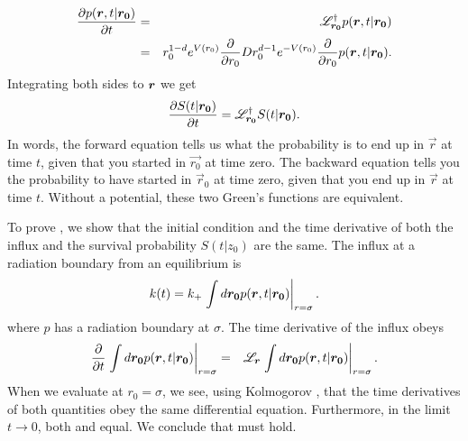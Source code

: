 \begin{eqnarray}
 \elabel{backward_eqn}
 \pdiff{p(\vect{r},t|\vect{r_0})}{t} & = & \mathscr{L}_{\vect{r_0}}^{\dag} p(\vect{r},t|\vect{r_0}) \\
 & = & r_0^{1-d} e^{V(r_0)} \pdiff{}{r_0} D r_0^{d-1} e^{-V(r_0)} \pdiff{}{r_0} p(\vect{r},t|\vect{r_0}). 
\end{eqnarray}
Integrating both sides to $\boldsymbol{r}$ we get
\begin{equation}
 \pdiff{S(t|\vect{r_0})}{t} = \mathscr{L}_{\vect{r_0}}^{\dag} S(t|\vect{r_0}).
 \elabel{S_eqn}
\end{equation}
In words, the forward equation tells us what the probability is to end up in $\vec{r}$ at time $t$, given that you started in $\vec{r_0}$ at time zero. The backward equation tells you the probability to have started in $\vec{r}_0$ at time zero, given that you end up in $\vec{r}$ at time $t$. Without a potential, these two Green's functions are equivalent.

To prove , we show that the initial condition and the time derivative of both the influx and the survival probability $S(t|z_0)$ are the same. The influx at a radiation boundary from an equilibrium is
\begin{equation}
 k(t) = k_+ \left. \int d\vect{r_0} p(\vect{r},t|\vect{r_0}) \right|_{r=\sigma}.
 \elabel{bsm_3}
\end{equation}
where $p$ has a radiation boundary at $\sigma$. The time derivative of the influx obeys
\begin{eqnarray}
 \frac{\partial }{\partial t} \left. \int d\boldsymbol{r_0} p(\boldsymbol{r},t|\boldsymbol{r_0}) \right|_{r=\sigma} & = & \mathscr{L}_{\boldsymbol{r}} \left. \int d\boldsymbol{r_0} p(\boldsymbol{r},t|\boldsymbol{r_0}) \right|_{r=\sigma}.
\end{eqnarray}
When we evaluate  at $r_0=\sigma$, we see, using Kolmogorov , that the time derivatives of both quantities obey the same differential equation. Furthermore, in the limit $t \to 0$, both  and  equal. We conclude that  must hold.



